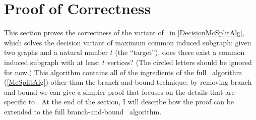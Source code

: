 \section{Proof of Correctness}\label{sec:mcsplit-proof}

This section proves the correctness of the variant of \McSplit\ in \cref{DecisionMcSplitAlg}, which solves
the decision variant of maximum common induced subgraph: given two graphs and a natural number
$t$ (the ``target''), does there exist a common induced subgraph with at least $t$ vertices?
(The circled letters should be ignored for now.)
This algorithm contains all of the ingredients of the full \McSplit\ algorithm (\cref{McSplitAlg})
other than the branch-and-bound technique; by removing branch and bound we can give a simpler
proof that focuses on the details that are specific to \McSplit.  At the end of the section,
I will describe how the proof can be extended to the full branch-and-bound \McSplit\ algorithm.

